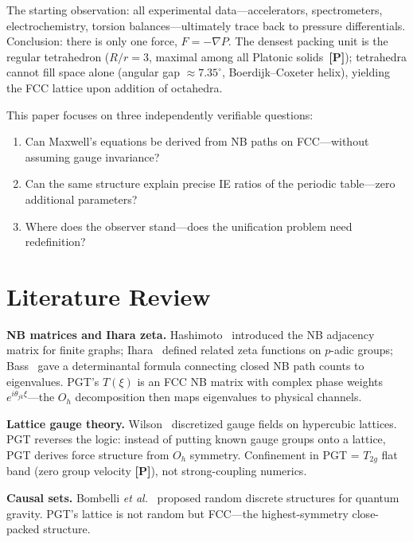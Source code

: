 \documentclass[11pt,a4paper]{article}
\newcommand{\gradeP}{\textbf{[P]}}
\begin{document}
The starting observation: all experimental data---accelerators, spectrometers, electrochemistry, torsion balances---ultimately trace back to pressure differentials. Conclusion: there is only one force, $F = -\nabla P$. The densest packing unit is the regular tetrahedron ($R/r = 3$, maximal among all Platonic solids~\gradeP); tetrahedra cannot fill space alone (angular gap $\approx 7.35^\circ$, Boerdijk--Coxeter helix), yielding the FCC lattice upon addition of octahedra.

This paper focuses on three independently verifiable questions:
\begin{enumerate}[nosep]
\item Can Maxwell's equations be derived from NB paths on FCC---without assuming gauge invariance?
\item Can the same structure explain precise IE ratios of the periodic table---zero additional parameters?
\item Where does the observer stand---does the unification problem need redefinition?
\end{enumerate}

\section{Literature Review}\label{sec:literature}

\textbf{NB matrices and Ihara zeta.}
Hashimoto~\cite{Hashimoto1989} introduced the NB adjacency matrix for finite graphs; Ihara~\cite{Ihara1966} defined related zeta functions on $p$-adic groups; Bass~\cite{Bass1992} gave a determinantal formula connecting closed NB path counts to eigenvalues. PGT's $T(\xi)$ is an FCC NB matrix with complex phase weights $e^{i\theta_{jk}\xi}$---the $O_h$ decomposition then maps eigenvalues to physical channels.

\textbf{Lattice gauge theory.}
Wilson~\cite{Wilson1974} discretized gauge fields on hypercubic lattices. PGT reverses the logic: instead of putting known gauge groups onto a lattice, PGT derives force structure from $O_h$ symmetry. Confinement in PGT = $T_{2g}$ flat band (zero group velocity \gradeP), not strong-coupling numerics.

\textbf{Causal sets.}
Bombelli \textit{et al.}~\cite{Bombelli1987} proposed random discrete structures for quantum gravity. PGT's lattice is not random but FCC---the highest-symmetry close-packed structure.
\end{document}

